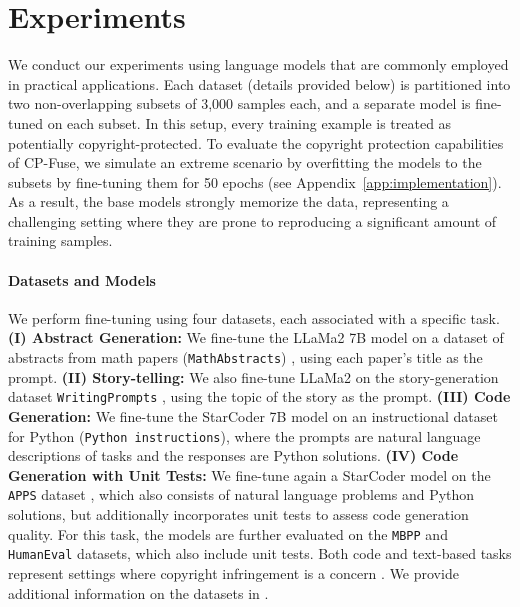 \section{Experiments}
\label{sec:experiments}



We conduct our experiments using language models that are commonly employed in practical applications. Each dataset (details provided below) is partitioned into two non-overlapping subsets of 3,000 samples each, and a separate model is fine-tuned on each subset. In this setup, every training example is treated as potentially copyright-protected. To evaluate the copyright protection capabilities of CP-Fuse, we simulate an extreme scenario by overfitting the models to the subsets by fine-tuning them for 50 epochs (see Appendix~\ref{app:implementation}). As a result, the base models strongly memorize the data, representing a challenging setting where they are prone to reproducing a significant amount of training samples.


\paragraph{Datasets and Models} We perform fine-tuning using four datasets, each associated with a specific task. \textbf{(I) Abstract Generation:} We fine-tune the LLaMa2 7B model \citep{touvron2023llama} on a dataset of abstracts from math papers (\texttt{MathAbstracts}) \citep{zhang2024autonomous}, using each paper's title as the prompt. 
\textbf{(II) Story-telling:} We also fine-tune LLaMa2 on the story-generation dataset \texttt{WritingPrompts} \citep{fan2018hierarchical}, using the topic of the story as the prompt. \textbf{(III) Code Generation:} We fine-tune the StarCoder 7B model \citep{li2023starcoder} on an instructional dataset for Python (\texttt{Python instructions}), where the prompts are natural language descriptions of tasks and the responses are Python solutions. \textbf{(IV) Code Generation with Unit Tests:} We fine-tune again a StarCoder model on the \texttt{APPS} dataset \citep{hendrycksapps2021}, which also consists of natural language problems and Python solutions, but additionally incorporates unit tests to assess code generation quality. For this task, the models are further evaluated on the \texttt{MBPP} \citep{austin2021program} and \texttt{HumanEval} \citep{chen2021evaluating} datasets, which also include unit tests. Both code and text-based tasks represent settings where copyright infringement is a concern \citep{yu2023codeiipprompt, henderson2023foundation}. We provide additional information on the datasets in .

